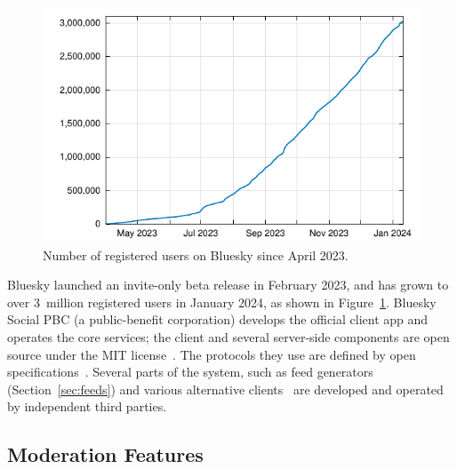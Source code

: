 \documentclass[sigconf,nonacm]{acmart}
\begin{document}
\begin{figure}
    \centering
    \includegraphics[width=\linewidth]{user-growth.pdf}
    \caption{Number of registered users on Bluesky since April 2023.}
    \label{fig:user-growth}
\end{figure}

Bluesky launched an invite-only beta release in February 2023, and has grown to over 3~million registered users in January 2024, as shown in Figure~\ref{fig:user-growth}.
Bluesky Social PBC (a public-benefit corporation) develops the official client app and operates the core services; the client and several server-side components are open source under the MIT license~\cite{BlueskyGithub}.
The protocols they use are defined by open specifications~\cite{AtProtoSpecs}.
Several parts of the system, such as feed generators (Section~\ref{sec:feeds}) and various alternative clients~\cite{AtProtoClients} are developed and operated by independent third parties.

\subsection{Moderation Features}\label{sec:moderation}
\end{document}
